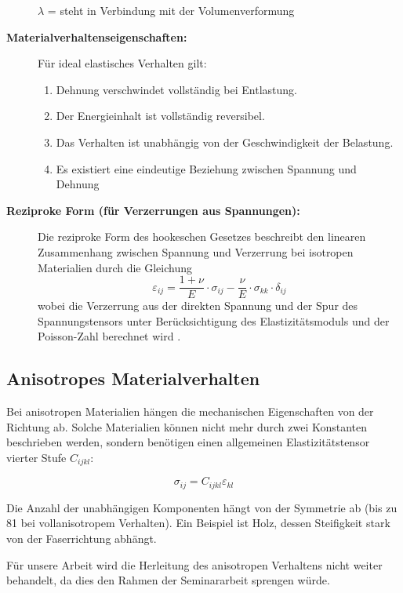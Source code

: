 \begin{description}
	$\lambda$ = steht in Verbindung mit der Volumenverformung
	
	\item[\textbf{Materialverhaltenseigenschaften:}] Für ideal elastisches Verhalten gilt:
	\begin{enumerate}
		\item Dehnung verschwindet vollständig bei Entlastung.
		
		\item Der Energieinhalt ist vollständig reversibel.
		
		\item Das Verhalten ist unabhängig von der Geschwindigkeit der Belastung.
		
		\item Es existiert eine eindeutige Beziehung zwischen Spannung und Dehnung
	\end{enumerate}
	\item[\textbf{Reziproke Form (für Verzerrungen aus Spannungen):}] Die reziproke Form des hookeschen Gesetzes beschreibt den linearen Zusammenhang zwischen Spannung und Verzerrung bei isotropen Materialien durch die Gleichung
	\begin{equation}
		\varepsilon_{ij} = 
		\frac{1+\nu}{E} \cdot \sigma_{ij} - \frac{\nu}{E} \cdot \sigma_{kk} \cdot \delta_{ij}
	\end{equation}
	wobei die Verzerrung aus der direkten Spannung und der Spur des Spannungstensors unter Berücksichtigung des Elastizitätsmoduls und der Poisson-Zahl berechnet wird \cite{elastomechanik:Grundlagen_der_Elastizitaetstheorie}.
\end{description}

\subsection{Anisotropes Materialverhalten}

Bei anisotropen Materialien hängen die mechanischen Eigenschaften von der Richtung ab. Solche Materialien können nicht mehr durch zwei Konstanten beschrieben werden, sondern benötigen einen allgemeinen Elastizitätstensor vierter Stufe $C_{ijkl}$:

\begin{equation}
	\sigma_{ij} = C_{ijkl} \varepsilon_{kl}
\end{equation}

Die Anzahl der unabhängigen Komponenten hängt von der Symmetrie ab (bis zu 81 bei vollanisotropem Verhalten). Ein Beispiel ist Holz, dessen Steifigkeit stark von der Faserrichtung abhängt.

Für unsere Arbeit wird die Herleitung des anisotropen Verhaltens nicht weiter behandelt, da dies den Rahmen der Seminararbeit sprengen würde.
